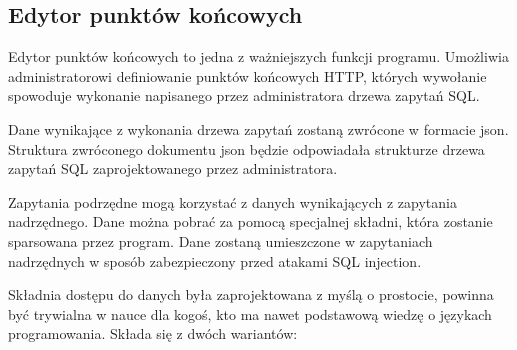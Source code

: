 \subsection{Edytor punktów końcowych}

Edytor punktów końcowych to jedna z ważniejszych funkcji programu. Umożliwia
administratorowi definiowanie punktów końcowych HTTP, których wywołanie
spowoduje wykonanie napisanego przez administratora drzewa zapytań SQL.

Dane wynikające z wykonania drzewa zapytań zostaną zwrócone w formacie json.
Struktura zwróconego dokumentu json będzie odpowiadała strukturze drzewa zapytań
SQL zaprojektowanego przez administratora.

Zapytania podrzędne mogą korzystać z danych wynikających z zapytania
nadrzędnego. Dane można pobrać za pomocą specjalnej składni, która zostanie
sparsowana przez program. Dane zostaną umieszczone w zapytaniach nadrzędnych w
sposób zabezpieczony przed atakami SQL injection.

Składnia dostępu do danych była zaprojektowana z myślą o prostocie, powinna być
trywialna w nauce dla kogoś, kto ma nawet podstawową wiedzę o językach
programowania. Składa się z dwóch wariantów:

